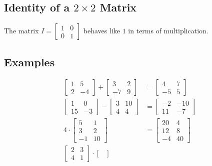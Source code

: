 \documentclass[letterpaper, 12pt]{math}
\begin{document}
\subsection*{Identity of a \( 2\times2 \) Matrix}
The matrix \( I = \begin{bmatrix} 1 & 0 \\ 0 & 1 \end{bmatrix} \) behaves like
\( 1 \) in terms of multiplication.

\subsection*{Examples}
\begin{align*}
  \begin{bmatrix}
    1 & 5 \\
    2 & -4
  \end{bmatrix}+
  \begin{bmatrix}
    3 & 2 \\
    -7 & 9
  \end{bmatrix}&=
  \begin{bmatrix}
    4 & 7 \\
    -5 & 5
  \end{bmatrix} \\
  \begin{bmatrix}
    1 & 0 \\
    15 & -3
  \end{bmatrix}-
  \begin{bmatrix}
    3 & 10 \\
    4 & 4
  \end{bmatrix}&=
  \begin{bmatrix}
    -2 & -10 \\
    11 & -7
  \end{bmatrix} \\
  4\cdot
  \begin{bmatrix}
    5 & 1 \\
    3 & 2 \\
    -1 & 10
  \end{bmatrix}&=
  \begin{bmatrix}
    20 & 4 \\
    12 & 8 \\
    -4 & 40
  \end{bmatrix} \\
  \begin{bmatrix}
    2 & 3 \\
    4 & 1
  \end{bmatrix}\cdot
  \begin{bmatrix}

\end{bmatrix}
\end{align*}
\end{document}
